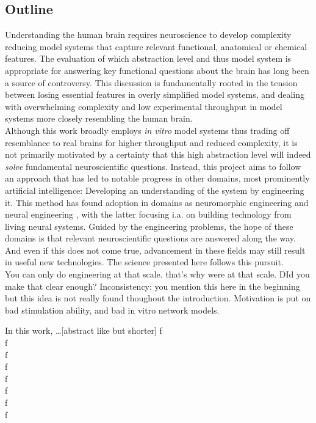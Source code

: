 \subsection{Outline}
Understanding the human brain requires neuroscience to develop complexity
reducing model systems that capture relevant functional, anatomical or chemical
features. The evaluation of which abstraction level and thus model system is
appropriate for answering key functional questions about the brain has long been
a source of controversy. This discussion is fundamentally rooted in the tension
between losing essential features in overly simplified model systems, and
dealing with overwhelming complexity and low experimental throughput in model
systems more closely resembling the human brain. \\
Although this work broadly employs \textit{in vitro} model systems thus trading
off resemblance to real brains for higher throughput and reduced complexity, it
is not primarily motivated by a certainty that this high abstraction level will
indeed \textit{solve} fundamental neuroscientific questions. Instead, this
project aims to follow an approach that has led to notable progress in other
domains, most prominently artificial intelligence: Developing an understanding
of the system by engineering it. This method has found adoption in domains as
neuromorphic engineering \parencite{neuromorphic} and neural engineering
\parencite{neuroengineering}, with the latter focusing i.a. on building
technology from living neural systems. Guided by the engineering problems, the
hope of these domains is that relevant neuroscientific questions are answered
along the way. And even if this does not come true, advancement in these fields
may still result in useful new technologies. The science presented here follows
this pursuit.\\ 

You can only do engineering at that scale. that's why were at that scale. DId
you make that clear enough? Inconsistency:  you mention this here in the
beginning but this idea is not really found thoughout the introduction.
Motivation is put on bad stimulation ability, and bad in vitro network models. 

In this work, \dots [abstract like but shorter]
f\\
f\\
f\\
f\\
f\\
f\\
f\\
f\\


